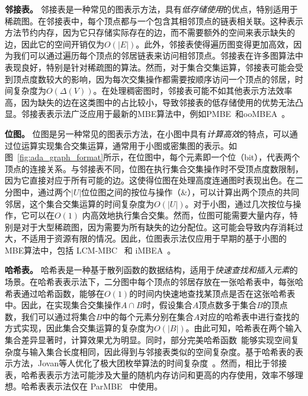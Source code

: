 \textbf{邻接表。} 邻接表是一种常见的图表示方法，具有\emph{低存储使用}的优点，特别适用于稀疏图。在邻接表中，每个顶点都与一个包含其相邻顶点的链表相关联。这种表示方法节约内存，因为它只存储实际存在的边，而不需要额外的空间来表示缺失的边，因此它的空间开销仅为$O(|E|)$。此外，邻接表使得遍历图变得更加高效，因为我们可以通过遍历每个顶点的邻居链表来访问相邻顶点。邻接表在许多图算法中表现良好，特别是针对稀疏图的算法。然而，对于集合交集运算，邻接表可能会受到顶点度数较大的影响，因为每次交集操作都需要按顺序访问一个顶点的邻居，时间复杂度为$O(\Delta(V))$。在处理稠密图时，邻接表可能不如其他表示方法效率高，因为缺失的边在这类图中的占比较小，导致邻接表的低存储使用的优势无法凸显。邻接表表示法广泛应用于最新的MBE算法中，例如PMBE~\cite{PMBE20}和ooMBEA~\cite{ooMBE22}。

\textbf{位图。} 位图是另一种常见的图表示方法，在小图中具有\emph{计算高效}的特点，可以通过位运算实现集合交集运算，通常用于小图或密集图的表示。如图~\ref{fig:ada_graph_format}所示，在位图中，每个元素即一个位（bit），代表两个顶点的连接关系。与邻接表不同，位图在执行集合交集操作时不受顶点度数限制，因为它直接对应于所有可能的边。这使得位图在处理高度连通图时表现出色。在二分图中，通过两个$|U|$位位图之间的按位与操作（\&），可以计算出两个顶点的共同邻居，这个集合交集运算的时间复杂度为$O(|U|)$。对于小图，通过几次按位与操作，它可以在$O(1)$ 内高效地执行集合交集。然而，位图可能需要大量内存，特别是对于大型稀疏图，因为需要为所有缺失的边分配位。这可能会导致内存消耗过大，不适用于资源有限的情况。因此，位图表示法仅应用于早期的基于小图的MBE算法中，包括 LCM-MBC~\cite{lcmmbc07} 和 iMBEA~\cite{iMBEA14}。

\textbf{哈希表。} 哈希表是一种基于散列函数的数据结构，适用于\emph{快速查找和插入元素}的场景。在哈希表表示法下，二分图中每个顶点的邻居存放在一张哈希表中，每张哈希表通过哈希函数，能够在$O(1)$的时间内快速地查找某顶点是否在这张哈希表中。因此，在实现集合交集操作$A \cap B$时，假设集合$A$顶点数多于集合$B$的顶点数，我们可以通过将集合$B$中的每个元素分别在集合$A$对应的哈希表中进行查找的方式实现，因此集合交集运算的复杂度为$O(|B|)$。由此可知，哈希表在两个输入集合差异显著时，计算效果尤为明显。同时，部分完美哈希函数~\cite{cuckoohash04,murmurhash}能够实现空间复杂度与输入集合长度相同，因此得到与邻接表类似的空间复杂度。基于哈希表的表示方法，Jovan等人优化了极大团枚举算法的时间复杂度~\cite{MCE20}。然而，相比于邻接表，哈希表表示方法可能涉及大量的随机内存访问和更高的内存使用，效率不够理想。哈希表表示法仅在 ParMBE~\cite{parMBE18} 中使用。




